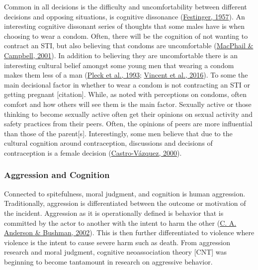 \documentclass[
  donotrepeattitle,doc, 12pt, a4paper,floatsintext]{apa7}
\begin{document}
Common in all decisions is the difficulty and uncomfortability between different decisions and opposing situations, is cognitive dissonance (\protect\hyperlink{ref-festinger1957}{Festinger, 1957}). An interesting cognitive dissonant series of thoughts that some males have is when choosing to wear a condom. Often, there will be the cognition of not wanting to contract an STI, but also believing that condoms are uncomfortable (\protect\hyperlink{ref-macphail2001}{MacPhail \& Campbell, 2001}). In addition to believing they are uncomfortable there is an interesting cultural belief amongst some young men that wearing a condom makes them less of a man (\protect\hyperlink{ref-pleck1993}{Pleck et al., 1993}; \protect\hyperlink{ref-vincent2016}{Vincent et al., 2016}). To some the main decisional factor in whether to wear a condom is not contracting an STI or getting pregnant {[}citation{]}. While, as noted with perceptions on condoms, often comfort and how others will see them is the main factor. Sexually active or those thinking to become sexually active often get their opinions on sexual activity and safety practices from their peers. Often, the opinions of peers are more influential than those of the parent{[}s{]}. Interestingly, some men believe that due to the cultural cognition around contraception, discussions and decisions of contraception is a female decision (\protect\hyperlink{ref-castrovazquez2000}{Castro-Vázquez, 2000}).

\hypertarget{aggression-and-cognition}{%
\subsubsection{Aggression and Cognition}\label{aggression-and-cognition}}

Connected to spitefulness, moral judgment, and cognition is human aggression. Traditionally, aggression is differentiated between the outcome or motivation of the incident. Aggression as it is operationally defined is behavior that is committed by the actor to another with the intent to harm the other (\protect\hyperlink{ref-anderson2002}{C. A. Anderson \& Bushman, 2002}). This is then further differentiated to violence where violence is the intent to cause severe harm such as death. From aggression research and moral judgment, cognitive neoassociation theory {[}CNT{]} was beginning to become tantamount in research on aggressive behavior.
\end{document}
